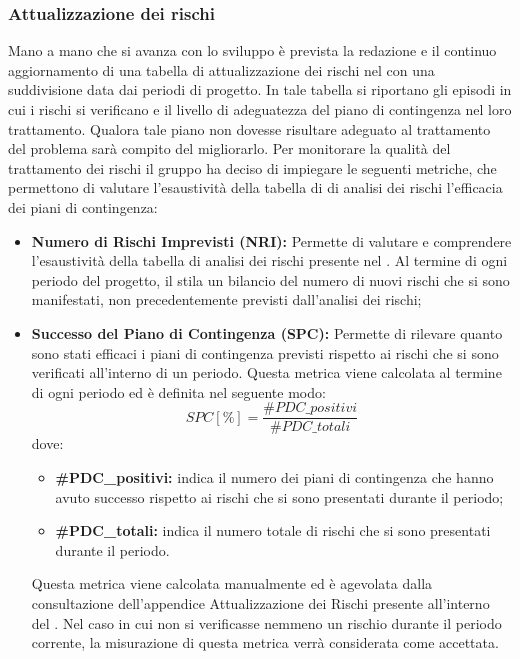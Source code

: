 \subsubsection{Attualizzazione dei rischi}
Mano a mano che si avanza con lo sviluppo è prevista la redazione e il continuo aggiornamento di una tabella di attualizzazione dei rischi nel \docNameVersionPdP{} con una suddivisione data dai periodi di progetto. In tale tabella si riportano gli episodi in cui i rischi si verificano e il livello di adeguatezza del piano di contingenza nel loro trattamento. Qualora tale piano non dovesse risultare adeguato al trattamento del problema sarà compito del \roleProjectManager{} migliorarlo.
Per monitorare la qualità del trattamento dei rischi il gruppo \groupName{} ha deciso di impiegare le seguenti metriche, che permettono di valutare l'esaustività della tabella di di analisi dei rischi l'efficacia dei piani di contingenza:
\begin{itemize}
	\item \textbf{Numero di Rischi Imprevisti (NRI):}\label{metrics:NRI} Permette di valutare e comprendere l'esaustività della tabella di analisi dei rischi presente nel \docNameVersionPdP{}. Al termine di ogni periodo del progetto, il \roleProjectManager{} stila un bilancio del numero di nuovi rischi che si sono manifestati, non precedentemente previsti dall'analisi dei rischi; \\
	\item \textbf{Successo del Piano di Contingenza (SPC):}\label{metrics:SPC} Permette di rilevare quanto sono stati efficaci i piani di contingenza previsti rispetto ai rischi che si sono verificati all'interno di un periodo. Questa metrica viene calcolata al termine di ogni periodo ed è definita nel seguente modo: 
	$$
	SPC[\%]=\frac{\#PDC\_positivi}{\#PDC\_totali} 
	$$ 
	dove:
	\begin{itemize}
		\item \textbf{\#PDC\_positivi: }indica il numero dei piani di contingenza che hanno avuto successo rispetto ai rischi che si sono presentati durante il periodo;
		\item \textbf{\#PDC\_totali: }indica il numero totale di rischi che si sono presentati durante il periodo.
	\end{itemize}
	Questa metrica viene calcolata manualmente ed è agevolata dalla consultazione dell'appendice Attualizzazione dei Rischi presente all'interno del \docNameVersionPdP{}.
	Nel caso in cui non si verificasse nemmeno un rischio durante il periodo corrente, la misurazione di questa metrica verrà considerata come accettata.
\end{itemize}

